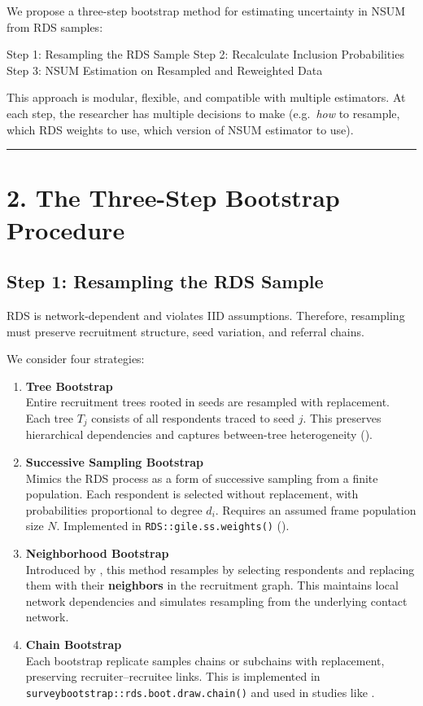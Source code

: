 \documentclass[
  12pt,
  letterpaper,
  DIV=11,
  numbers=noendperiod]{scrartcl}
\theoremstyle{plain}
\theoremstyle{definition}
\begin{document}
We propose a three-step bootstrap method for estimating uncertainty in
NSUM from RDS samples:

Step 1: Resampling the RDS Sample Step 2: Recalculate Inclusion
Probabilities Step 3: NSUM Estimation on Resampled and Reweighted Data

This approach is modular, flexible, and compatible with multiple
estimators. At each step, the researcher has multiple decisions to make
(e.g.~\emph{how} to resample, which RDS weights to use, which version of
NSUM estimator to use).

\begin{center}\rule{0.5\linewidth}{0.5pt}\end{center}

\section{2. The Three-Step Bootstrap
Procedure}\label{the-three-step-bootstrap-procedure}

\subsection{Step 1: Resampling the RDS
Sample}\label{step-1-resampling-the-rds-sample-1}

RDS is network-dependent and violates IID assumptions. Therefore,
resampling must preserve recruitment structure, seed variation, and
referral chains.

We consider four strategies:

\begin{enumerate}
\def\labelenumi{\arabic{enumi}.}
\item
  \textbf{Tree Bootstrap}\\
  Entire recruitment trees rooted in seeds are resampled with
  replacement. Each tree \(T_j\) consists of all respondents traced to
  seed \(j\). This preserves hierarchical dependencies and captures
  between-tree heterogeneity (\textcite{salg06-variance}).
\item
  \textbf{Successive Sampling Bootstrap}\\
  Mimics the RDS process as a form of successive sampling from a finite
  population. Each respondent is selected without replacement, with
  probabilities proportional to degree \(d_i\). Requires an assumed
  frame population size \(N\). Implemented in
  \texttt{RDS::gile.ss.weights()} (\textcite{gile11-inference}).
\item
  \textbf{Neighborhood Bootstrap}\\
  Introduced by \textcite{yauc22-neighboot}, this method resamples by
  selecting respondents and replacing them with their \textbf{neighbors}
  in the recruitment graph. This maintains local network dependencies
  and simulates resampling from the underlying contact network.
\item
  \textbf{Chain Bootstrap}\\
  Each bootstrap replicate samples chains or subchains with replacement,
  preserving recruiter--recruitee links. This is implemented in
  \texttt{surveybootstrap::rds.boot.draw.chain()} and used in studies
  like \textcite{weir12-comparison}.
\end{enumerate}
\end{document}
